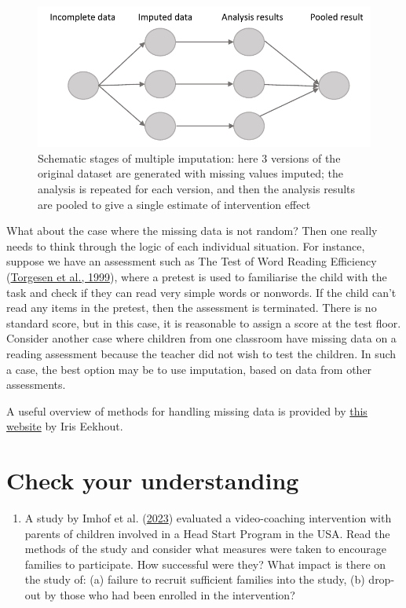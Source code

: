 \documentclass{krantz}
\providecommand{\tightlist}{%
\setlength{\itemsep}{0pt}\setlength{\parskip}{0pt}}
\begin{document}
\begin{center}
\begin{figure}
\includegraphics[width=0.75\linewidth]{images_bw/mice_fig} \caption{Schematic stages of multiple imputation: here 3 versions of the original dataset are generated with missing values imputed; the analysis is repeated for each version, and then the analysis results are pooled to give a single estimate of intervention effect}\label{fig:micefig}
\end{figure}
\end{center}

What about the case where the missing data is not random? Then one really needs to think through the logic of each individual situation. For instance, suppose we have an assessment such as The Test of Word Reading Efficiency (\protect\hyperlink{ref-torgesen1999}{Torgesen et al., 1999}), where a pretest is used to familiarise the child with the task and check if they can read very simple words or nonwords. If the child can't read any items in the pretest, then the assessment is terminated. There is no standard score, but in this case, it is reasonable to assign a score at the test floor. Consider another case where children from one classroom have missing data on a reading assessment because the teacher did not wish to test the children. In such a case, the best option may be to use imputation, based on data from other assessments.

A useful overview of methods for handling missing data is provided by \href{https://www.missingdata.nl/}{this website} by Iris Eekhout.

\hypertarget{check-your-understanding-8}{%
\section{Check your understanding}\label{check-your-understanding-8}}

\begin{enumerate}
\def\labelenumi{\arabic{enumi}.}
\tightlist
\item
  A study by Imhof et al. (\protect\hyperlink{ref-imhof2023}{2023}) evaluated a video-coaching intervention with parents of children involved in a Head Start Program in the USA. Read the methods of the study and consider what measures were taken to encourage families to participate. How successful were they? What impact is there on the study of: (a) failure to recruit sufficient families into the study, (b) drop-out by those who had been enrolled in the intervention?
\end{enumerate}
\end{document}
